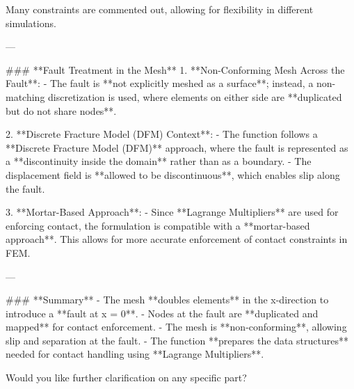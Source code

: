   Many constraints are commented out, allowing for flexibility in different simulations.

---

### **Fault Treatment in the Mesh**
1. **Non-Conforming Mesh Across the Fault**:
   - The fault is **not explicitly meshed as a surface**; instead, a non-matching discretization is used, where elements on either side are **duplicated but do not share nodes**.

2. **Discrete Fracture Model (DFM) Context**:
   - The function follows a **Discrete Fracture Model (DFM)** approach, where the fault is represented as a **discontinuity inside the domain** rather than as a boundary.
   - The displacement field is **allowed to be discontinuous**, which enables slip along the fault.

3. **Mortar-Based Approach**:
   - Since **Lagrange Multipliers** are used for enforcing contact, the formulation is compatible with a **mortar-based approach**. This allows for more accurate enforcement of contact constraints in FEM.

---

### **Summary**
- The mesh **doubles elements** in the x-direction to introduce a **fault at x = 0**.
- Nodes at the fault are **duplicated and mapped** for contact enforcement.
- The mesh is **non-conforming**, allowing slip and separation at the fault.
- The function **prepares the data structures** needed for contact handling using **Lagrange Multipliers**.

Would you like further clarification on any specific part? 🚀